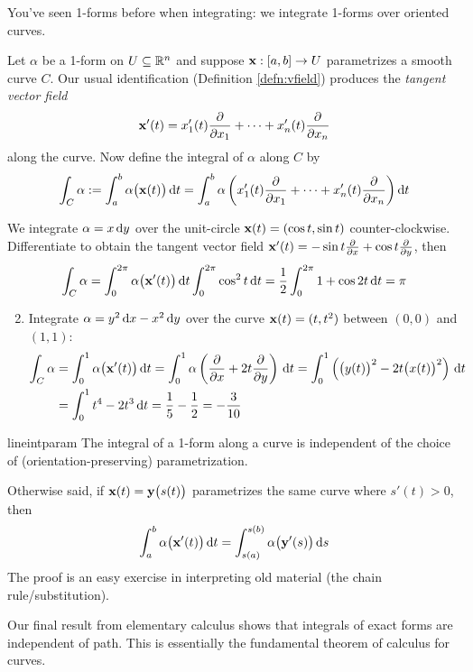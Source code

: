 You've seen 1-forms before when integrating: we integrate 1-forms over oriented curves.

\begin{defn}{}{}
Let $\alpha$ be a 1-form on $U\subseteq\mathbb{R}^n$ and suppose ${\mathbf{x}}:[a,b]\to U$ parametrizes a smooth curve $C$. Our usual identification (Definition \ref{defn:vfield}) produces the \emph{tangent vector field}
\[{\mathbf{x}}'(t)=x_1'(t)\frac{\partial }{\partial x_1}+\cdots +x_n'(t)\frac{\partial }{\partial x_n}\]
along the curve. Now define the integral of $\alpha$ along $C$ by
\[\int_{C}\alpha:=\int_a^b\alpha\bigl({\mathbf{x}}(t)\bigr)\,{\mathrm{d} t}=\int_a^b\alpha\left(x_1'(t)\frac{\partial }{\partial x_1}+\cdots +x_n'(t)\frac{\partial }{\partial x_n}\right){\mathrm{d} t}\]
\end{defn}


\begin{examples}{}{}
	\exstart We integrate $\alpha=x\,{\mathrm{d} y}$ over the unit-circle ${\mathbf{x}}(t)=(\cos t,\sin t)$ counter-clockwise. Differentiate to obtain the tangent vector field ${\mathbf{x}}'(t)=-\sin t\frac{\partial }{\partial x}+\cos t\frac{\partial }{\partial y}$, then
	\[
		\int_{C}\alpha=\int_0^{2\pi}\alpha\bigl({\mathbf{x}}'(t)\bigr)\,{\mathrm{d} t} \int_0^{2\pi}\cos^2t\,{\mathrm{d} t} =\frac 12\int_0^{2\pi}1+\cos 2t\,{\mathrm{d} t}=\pi
	\]
	\begin{enumerate}\setcounter{enumi}{1}
		\item Integrate $\alpha=y^2\,{\mathrm{d} x}-x^2\,{\mathrm{d} y}$ over the curve ${\mathbf{x}}(t)=(t,t^2)$ between $(0,0)$ and $(1,1)$:
		\begin{align*}
			\int_{C}\alpha&=\int_0^1\alpha\bigl({\mathbf{x}}'(t)\bigr)\,{\mathrm{d} t} = \int_0^1\alpha\left(\frac{\partial }{\partial x}+2t\frac{\partial }{\partial y}\right)\,{\mathrm{d} t} =\int_0^1\left(\bigl(y(t)\bigr)^2-2t\bigl(x(t)\bigr)^2\right)\,{\mathrm{d} t}\\
			&=\int_0^1t^4-2t^3\,{\mathrm{d} t}=\frac 15-\frac 12=-\frac 3{10}
		\end{align*}
	\end{enumerate}
\end{examples}

\begin{lemm}{}{lineintparam}
	The integral of a 1-form along a curve is independent of the choice of (orientation-preserving) parametrization.
\end{lemm}

Otherwise said, if ${\mathbf{x}}(t)={\mathbf{y}}\bigl(s(t)\bigr)$ parametrizes the same curve where $s'(t)>0$, then
\[
	\int_a^b\alpha\bigl({\mathbf{x}}'(t)\bigr)\,{\mathrm{d} t}=\int_{s(a)}^{s(b)}\alpha\bigl({\mathbf{y}}'(s)\bigr)\,{\mathrm{d} s}
\]
The proof is an easy exercise in interpreting old material (the chain rule/substitution).\smallbreak

Our final result from elementary calculus shows that integrals of exact forms are independent of path. This is essentially the fundamental theorem of calculus for curves.

